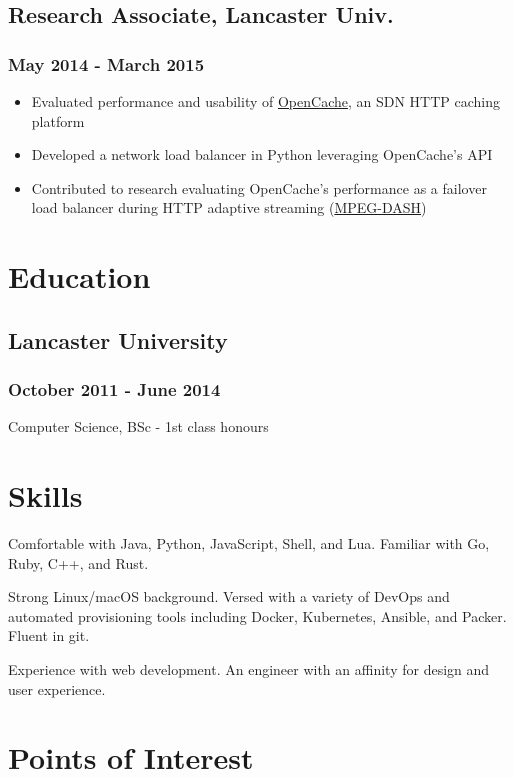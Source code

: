 \documentclass[a4paper,11pt]{article}
\begin{document}
\begin{multicols*}{2}
\subsection*{Research Associate, Lancaster Univ.}
\subsubsection*{May 2014 - March 2015}
\begin{itemize}[leftmargin=*]
	\item Evaluated performance and usability of \href{https://github.com/broadbent/opencache}{OpenCache}, an SDN HTTP caching platform
	\item Developed a network load balancer in Python leveraging OpenCache's API
	\item Contributed to research evaluating OpenCache's performance as a failover load balancer during HTTP adaptive streaming (\href{https://en.wikipedia.org/wiki/Dynamic_Adaptive_Streaming_over_HTTP}{MPEG-DASH})
\end{itemize}

\section*{Education}
\subsection*{Lancaster University}
\subsubsection*{October 2011 - June 2014}
Computer Science, BSc - 1st class honours\par

\section*{Skills}
Comfortable with Java, Python, JavaScript, Shell, and Lua. Familiar with Go, Ruby, C++, and Rust.\medskip

Strong Linux/macOS background. Versed with a variety of DevOps and automated provisioning tools including Docker, Kubernetes, Ansible, and Packer. Fluent in git.\medskip

Experience with web development. An engineer with an affinity for design and user experience.

\section*{Points of Interest}

\end{multicols*}
\end{document}
